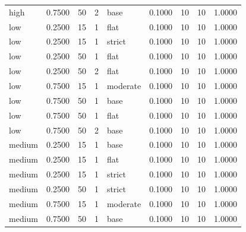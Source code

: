 \begin{tabular}{lrrrlrrrr}
high & 0.7500 & 50 & 2 & base & 0.1000 & 10 & 10 & 1.0000 \\
low & 0.2500 & 15 & 1 & flat & 0.1000 & 10 & 10 & 1.0000 \\
low & 0.2500 & 15 & 1 & strict & 0.1000 & 10 & 10 & 1.0000 \\
low & 0.2500 & 50 & 1 & flat & 0.1000 & 10 & 10 & 1.0000 \\
low & 0.2500 & 50 & 2 & flat & 0.1000 & 10 & 10 & 1.0000 \\
low & 0.7500 & 15 & 1 & moderate & 0.1000 & 10 & 10 & 1.0000 \\
low & 0.7500 & 50 & 1 & base & 0.1000 & 10 & 10 & 1.0000 \\
low & 0.7500 & 50 & 1 & flat & 0.1000 & 10 & 10 & 1.0000 \\
low & 0.7500 & 50 & 2 & base & 0.1000 & 10 & 10 & 1.0000 \\
medium & 0.2500 & 15 & 1 & base & 0.1000 & 10 & 10 & 1.0000 \\
medium & 0.2500 & 15 & 1 & flat & 0.1000 & 10 & 10 & 1.0000 \\
medium & 0.2500 & 15 & 1 & strict & 0.1000 & 10 & 10 & 1.0000 \\
medium & 0.2500 & 50 & 1 & strict & 0.1000 & 10 & 10 & 1.0000 \\
medium & 0.7500 & 15 & 1 & moderate & 0.1000 & 10 & 10 & 1.0000 \\
medium & 0.7500 & 50 & 1 & base & 0.1000 & 10 & 10 & 1.0000 \\
\bottomrule
\end{tabular}
